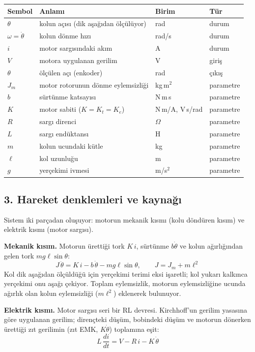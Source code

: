 \documentclass[11pt,a4paper]{article}
\begin{document}
\begin{center}
\begin{tabular}{llll}
\toprule
Sembol & Anlamı & Birim & Tür\\
\midrule
$\theta$ & kolun açısı (dik aşağıdan ölçülüyor) & rad & durum\\
$\omega = \dot\theta$ & kolun dönme hızı & rad/s & durum\\
$i$ & motor sargısındaki akım & A & durum\\
$V$ & motora uygulanan gerilim & V & giriş\\
$\theta$ & ölçülen açı (enkoder) & rad & çıkış\\
\midrule
$J_m$ & motor rotorunun dönme eylemsizliği & kg\,m$^2$ & parametre\\
$b$ & sürtünme katsayısı & N\,m\,s & parametre\\
$K$ & motor sabiti ($K = K_t = K_e$) & N\,m/A, V\,s/rad & parametre\\
$R$ & sargı direnci & $\Omega$ & parametre\\
$L$ & sargı endüktansı & H & parametre\\
$m$ & kolun ucundaki kütle & kg & parametre\\
$\ell$ & kol uzunluğu & m & parametre\\
$g$ & yerçekimi ivmesi & m/s$^2$ & parametre\\
\bottomrule
\end{tabular}
\end{center}

\subsection*{3. Hareket denklemleri ve kaynağı}

Sistem iki parçadan oluşuyor: motorun mekanik kısmı (kolu döndüren kısım) ve elektrik kısmı (motor sargısı).

\textbf{Mekanik kısım.} Motorun ürettiği tork $K\,i$, sürtünme $b\dot\theta$ ve kolun ağırlığından gelen tork $mg\ell\sin\theta$:
\[
J\,\ddot\theta = K\,i - b\,\dot\theta - mg\ell\sin\theta, \qquad J = J_m + m\ell^2
\]
Kol dik aşağıdan ölçüldüğü için yerçekimi terimi eksi işaretli; kol yukarı kalkınca yerçekimi onu aşağı çekiyor. Toplam eylemsizlik, motorun eylemsizliğine ucunda ağırlık olan kolun eylemsizliği ($m\ell^2$) eklenerek bulunuyor.

\textbf{Elektrik kısmı.} Motor sargısı seri bir RL devresi. Kirchhoff'un gerilim yasasına göre uygulanan gerilim; dirençteki düşüm, bobindeki düşüm ve motorun dönerken ürettiği zıt gerilimin (zıt EMK, $K\dot\theta$) toplamına eşit:
\[
L\,\frac{di}{dt} = V - R\,i - K\,\dot\theta
\]
\end{document}
